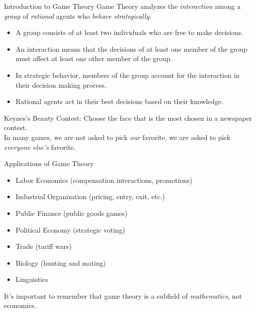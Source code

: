 \documentclass[10pt]{extarticle}
\title{}
\author{Avinash Iyer}
\date{}
\begin{document}
  \begin{problem}{Introduction to Game Theory}
    Game Theory analyzes the \textit{interaction} among a \textit{group} of \textit{rational} agents who \textit{behave strategically}.
    \begin{itemize}
      \item A group consists of at least two individuals who are free to make decisions.
      \item An interaction means that the decisions of at least one member of the group must affect at least one other member of the group.
      \item In strategic behavior, members of the group account for the interaction in their decision making process.
      \item Rational agents act in their best decisions based on their knowledge.
    \end{itemize}
    Keynes's Beauty Contest: Choose the face that is the most chosen in a newspaper contest.\\

    In many games, we are not asked to pick \textit{our} favorite, we are asked to pick \textit{everyone else's} favorite.
    \begin{problem}{Applications of Game Theory}
      \begin{itemize}
        \item Labor Economics (compensation interactions, promotions)
        \item Industrial Organization (pricing, entry, exit, etc.)
        \item Public Finance (public goods games)
        \item Political Economy (strategic voting)
        \item Trade (tariff wars)
        \item Biology (hunting and mating)
        \item Linguistics
      \end{itemize}
    \end{problem}
    It's important to remember that game theory is a subfield of \textit{mathematics}, not economics.
  \end{problem}
\end{document}

